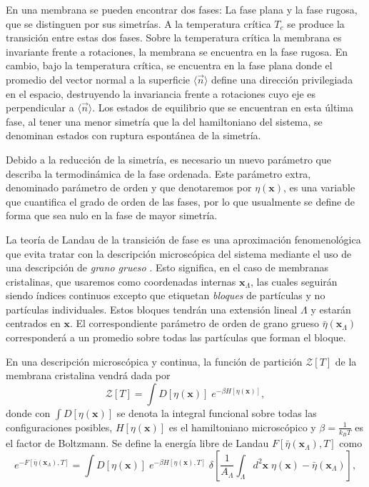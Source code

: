 En una membrana se pueden encontrar dos fases: La fase plana y la fase
rugosa, que se distinguen por sus simetrías. A la temperatura crítica $T_c$ se
produce la transición entre estas dos fases. Sobre la temperatura crítica la
membrana es invariante frente a rotaciones, 
la membrana se encuentra en la fase rugosa. En cambio, bajo la temperatura
crítica, se encuentra en la fase plana donde el promedio del vector normal a
la superficie $\langle \vec{n}\rangle$ define una dirección privilegiada en el
espacio, destruyendo la invariancia frente a rotaciones cuyo eje es
perpendicular a $\langle \vec{n}\rangle$. Los estados de equilibrio que se
encuentran en esta última fase, al tener una menor simetría que la del
hamiltoniano del sistema, se denominan estados con ruptura espontánea de la
simetría. 
 
Debido a la reducción de la simetría, es necesario un nuevo parámetro que 
describa la termodinámica de la fase ordenada. Este parámetro
extra, denominado parámetro de orden y que denotaremos por $\eta(\mathbf{x})$,
es una 
variable que cuantifica el grado de orden de
las fases, por lo que usualmente se define de forma que sea nulo en la fase
de mayor simetría.

\begin{figure}[h]
\centering
{}
\quad
{}
\end{figure}

La teoría de Landau de la transición de fase es una aproximación
fenomenológica que evita tratar con la descripción microscópica del sistema
mediante el uso de una descripción de \textit{grano grueso}
\cite{Goldenfield:Lecture_Notes}. Esto significa, 
en el caso de membranas cristalinas, que usaremos como coordenadas internas
$\mathbf{x}_{\Lambda}$, las cuales seguirán  siendo índices continuos excepto
que etiquetan \textit{bloques} de partículas y no partículas
individuales. Estos bloques tendrán una extensión lineal $\Lambda$ y estarán
centrados en $\mathbf{x}$. El correspondiente parámetro de orden de grano
grueso $\bar{\eta}(\mathbf{x}_{\Lambda})$ corresponderá a un promedio sobre
todas las partículas que forman el bloque.

En una descripción microscópica y continua, la función de partición
$\mathcal{Z}[T]$ de la membrana cristalina vendrá dada por
\begin{equation}\label{Zmicroscopica}
\mathcal{Z}[T]=\int D[\eta(\mathbf{x})]\; e^{-\beta H[\eta(\mathbf{x})]},
\end{equation}
donde con $\int D[\eta(\mathbf{x})]$ se denota la integral funcional sobre
todas las configuraciones posibles, $H[\eta(\mathbf{x})]$ es el hamiltoniano
microscópico y $\beta=\frac{1}{k_BT}$ es el factor de Boltzmann. Se define la
energía libre de Landau $F[\bar{\eta}(\mathbf{x}_{\Lambda}),T]$ como 
\begin{equation*}
e^{-F[\bar{\eta}(\mathbf{x}_{\Lambda}),T]}=\int D[\eta(\mathbf{x})]\; e^{-\beta
  H[\eta(\mathbf{x}),T]}
  \;\delta\left[\frac{1}{A_{\Lambda}}\int_{\Lambda} d^2\mathbf{x}\; \eta(\mathbf{x})-\bar{\eta}(\mathbf{x}_{\Lambda})\right],
\end{equation*}


